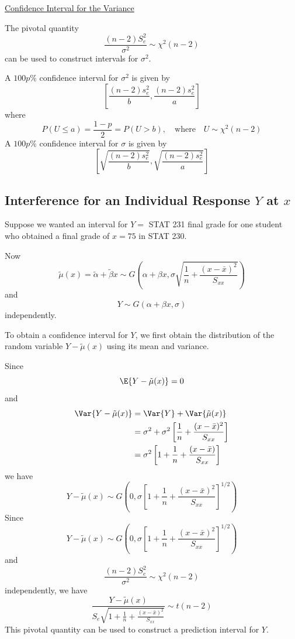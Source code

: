 \documentclass[oneside]{book}
\begin{document}
\underline{Confidence Interval for the Variance}

The pivotal quantity
\[ \frac{(n-2)S_e^2}{\sigma^2}\sim \chi^2(n-2)  \]
can be used to construct intervals for $ \sigma^2 $.

A $ 100p\% $ confidence interval for $ \sigma^2 $ is given by
\[ \left[ \frac{(n-2)s_e^2}{b} , \frac{(n-2)s_e^2}{a}  \right] \]
where
\[ P(U\leq a)=\frac{1-p}{2}=P(U>b),\quad\text{where}\quad U\sim \chi^2(n-2) \]
A $ 100p\% $ confidence interval for $ \sigma $ is given by
\[ \left[ \sqrt{\frac{(n-2)s_e^2}{b}} , \sqrt{\frac{(n-2)s_e^2}{a}}  \right] \]

\subsection{Interference for an Individual Response $ Y $ at $ x $}
Suppose we wanted an interval for $ Y= $ STAT 231 final grade for one student
who obtained a final grade of $ x=75 $ in STAT 230.

Now
\[\tilde{\mu}(x)=\tilde{\alpha}+\tilde{\beta} x \sim G\left(\alpha+\beta x,
    \sigma \sqrt{\frac{1}{n}+\frac{(x-\bar{x})^{2}}{S_{x x}}}\right)\]
and
\[ Y \sim G(\alpha+\beta x, \sigma) \]
independently.

To obtain a confidence interval for $ Y $, we first obtain the distribution
of the random variable $ Y-\tilde{\mu}(x) $ using its mean and variance.

Since
\[ \E{Y-\tilde{\mu}(x)}=0 \]
and
\begin{align*}
    \Var{Y-\tilde{\mu}(x)}
     & =\Var{Y}+\Var{\tilde{\mu}(x)}                                                    \\
     & =\sigma^2+\sigma^2\left[ \frac{1}{n} +\frac{(x-\bar{x})^2}{S_{xx}}  \right]      \\
     & =\sigma^2\left[ 1+\frac{1}{n} + \frac{\left( x-\bar{x} \right)}{S_{xx}}  \right]
\end{align*}
we have
\[ Y-\tilde{\mu}(x)\sim G\left( 0,\sigma\left[ 1+\frac{1}{n} + \frac{\left( x-\bar{x} \right)^2}{S_{xx}}  \right]
    ^{1/2} \right) \]
Since
\[ Y-\tilde{\mu}(x)\sim G\left( 0,\sigma\left[ 1+\frac{1}{n} + \frac{\left( x-\bar{x} \right)^2}{S_{xx}}  \right]
    ^{1/2} \right) \]
and
\[ \frac{(n-2)S_e^2}{\sigma^2}\sim \chi^2(n-2)  \]
independently, we have
\[ \frac{Y-\tilde{\mu}(x)}{S_{e} \sqrt{1+\frac{1}{n}+\frac{(x-\bar{x})^{2}}{S_{x x}}}} \sim t(n-2) \]
This pivotal quantity can be used to construct a prediction interval for $ Y $.
\end{document}
